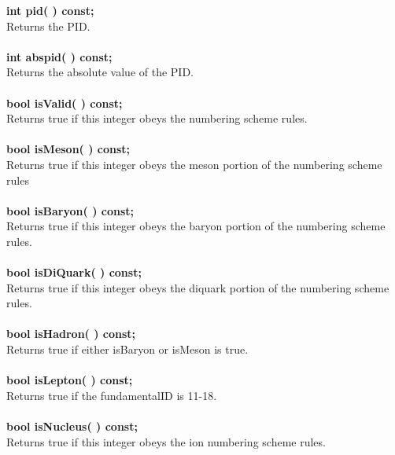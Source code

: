 \begin{tabbing}
\hspace{0.5in}  {\bf int    pid( )        const; } \\
\hspace{0.5in}  Returns the PID. \\ \\
\hspace{0.5in}  {\bf int abspid( )        const; } \\
\hspace{0.5in}  Returns the absolute value of the PID. \\ \\

\hspace{0.5in}  {\bf bool isValid( )   const; }\\
\hspace{0.5in}  Returns true if this integer obeys the numbering scheme rules. \\ \\
\hspace{0.5in}  {\bf bool isMeson( )   const; }\\
\hspace{0.5in}  Returns true if this integer obeys the meson  portion of the numbering scheme rules\\ \\
\hspace{0.5in}  {\bf bool isBaryon( )  const; }\\
\hspace{0.5in}  Returns true if this integer obeys the baryon portion of the numbering scheme rules.\\ \\
\hspace{0.5in}  {\bf bool isDiQuark( ) const; }\\
\hspace{0.5in}  Returns true if this integer obeys the diquark portion of the numbering scheme rules.\\ \\
\hspace{0.5in}  {\bf bool isHadron( )  const; }\\
\hspace{0.5in}  Returns true if either isBaryon or isMeson is true. \\ \\
\hspace{0.5in}  {\bf bool isLepton( )  const; }\\
\hspace{0.5in}  Returns true if the fundamentalID is 11-18. \\ \\
\hspace{0.5in}  {\bf bool isNucleus( )  const; }\\
\hspace{0.5in}  Returns true if this integer obeys the ion numbering scheme rules. \\ \\


\end{tabbing}
